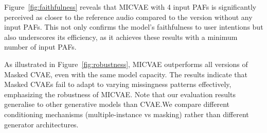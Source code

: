 \documentclass[a4paper,12pt,twoside,openright]{article}
\begin{document}
Figure~\ref{fig:faithfulness} reveals that MICVAE with 4 input PAFs is significantly perceived as closer to the reference audio compared to the version without any input PAFs. This not only confirms the model's faithfulness to user intentions but also underscores its efficiency, as it achieves these results with a minimum number of input PAFs.

As illustrated in Figure~\ref{fig:robustness}, MICVAE outperforms all versions of Masked CVAE, even with the same model capacity. The results indicate that Masked CVAEs fail to adapt to varying missingness patterns effectively, emphasizing the robustness of MICVAE. Note that our evaluation results generalise to other generative models than CVAE.\@ We compare different conditioning mechanisms (multiple-instance vs masking) rather than different generator architectures.





\end{document}
